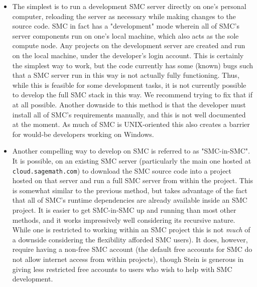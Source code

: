 \documentclass{deliverablereport}
\begin{document}
\begin{itemize}
    \item The simplest is to run a development SMC server directly on one's
        personal computer, reloading the server as necessary while making
        changes to the source code.  SMC in fact has a "development" mode
        wherein all of SMC's server components run on one's local machine,
        which also acts as the sole compute node.  Any projects on the
        development server are created and run on the local machine, under the
        developer's login account.  This is certainly the simplest way to work,
        but the code currently has some (known) bugs such that a SMC server run
        in this way is not actually fully functioning.  Thus, while this is
        feasible for some development tasks, it is not currently possible to
        develop the full SMC stack in this way.  We recommend trying to fix
        that if at all possible.  Another downside to this method is that the
        developer must install all of SMC's requirements manually, and this is
        not well documented at the moment.  As much of SMC is UNIX-oriented
        this also creates a barrier for would-be developers working on Windows.

    \item Another compelling way to develop on SMC is referred to as
        "SMC-in-SMC".  It is possible, on an existing SMC server (particularly
        the main one hosted at {\tt cloud.sagemath.com}) to download the SMC
        source code into a project hosted on that server and run a full SMC
        server from within the project.  This is somewhat similar to the
        previous method, but takes advantage of the fact that all of SMC's
        runtime dependencies are already available inside an SMC project.  It
        is easier to get SMC-in-SMC up and running than most other methods, and
        it works impressively well considering its recursive nature.  While one
        is restricted to working within an SMC project this is not \emph{much}
        of a downside considering the flexibility afforded SMC users).  It
        does, however, require having a non-free SMC account (the default free
        accounts for SMC do not allow internet access from within projects),
        though Stein is generous in giving less restricted free accounts to
        users who wish to help with SMC development.


\end{itemize}
\end{document}
